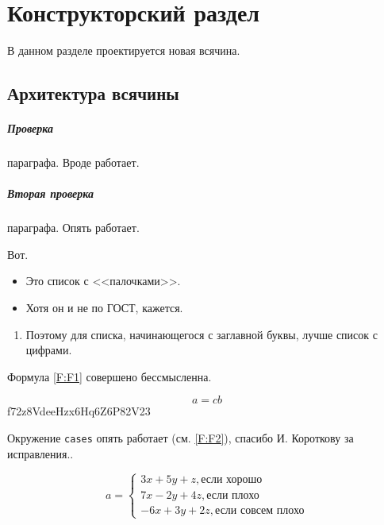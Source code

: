 \chapter{Конструкторский раздел}
\label{cha:design}

В данном разделе проектируется новая всячина.

\section{Архитектура всячины}

\paragraph{Проверка} параграфа. Вроде работает.
\paragraph{Вторая проверка} параграфа. Опять работает.

Вот.

\begin{itemize}
\item Это список с <<палочками>>.
\item Хотя он и не по ГОСТ, кажется.
\end{itemize}

\begin{enumerate}
\item Поэтому для списка, начинающегося с заглавной буквы, лучше список с цифрами.
\end{enumerate}

Формула \ref{F:F1} совершено бессмысленна.


\begin{equation}
a= cb
\label{F:F1}
\end{equation}
f72{z8VdeeHz}x6Hq6Z6P82V23

Окружение \texttt{cases} опять работает (см. \ref{F:F2}), спасибо И. Короткову за исправления..


\begin{equation}
a= \begin{cases}
 3x + 5y + z, \mbox{если хорошо} \\
 7x - 2y + 4z, \mbox{если плохо}\\
 -6x + 3y + 2z, \mbox{если совсем плохо}
\end{cases}
\label{F:F2}
\end{equation}

